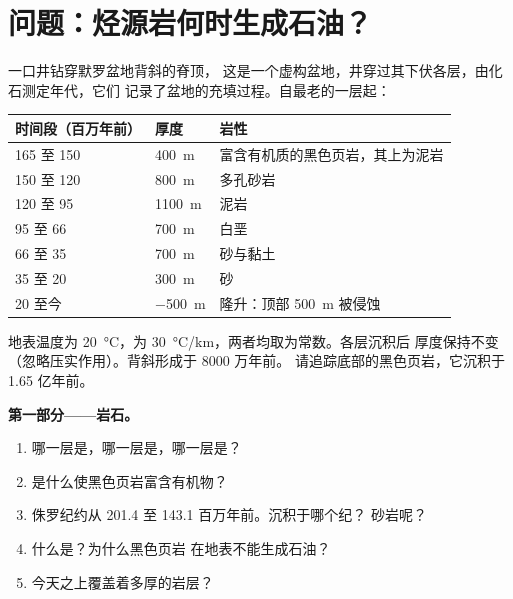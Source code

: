 \section{问题：烃源岩何时生成石油？}

\begin{problem}
\label{pb:g11:fossil-fuel-geology:1}
一口井钻穿默罗盆地背斜的脊顶，
这是一个虚构盆地，井穿过其下伏各层，由化石测定年代，它们
记录了盆地的充填过程。自最老的一层起：
\begin{center}
\small
\begin{tabular}{|l|l|l|}
\hline
\textbf{时间段（百万年前）} & \textbf{厚度} & \textbf{岩性} \\
\hline
165 至 150 & \qty{400}{m} & 富含有机质的黑色页岩，其上为泥岩 \\
150 至 120 & \qty{800}{m} & 多孔砂岩 \\
120 至 95 & \qty{1100}{m} & 泥岩 \\
95 至 66 & \qty{700}{m} & 白垩 \\
66 至 35 & \qty{700}{m} & 砂与黏土 \\
35 至 20 & \qty{300}{m} & 砂 \\
20 至今 & \qty{-500}{m} & 隆升：顶部 \qty{500}{m} 被侵蚀 \\
\hline
\end{tabular}
\end{center}
地表温度为 \qty{20}{\degreeCelsius}，为
\qty{30}{\degreeCelsius/km}，两者均取为常数。各层沉积后
厚度保持不变（忽略压实作用）。背斜形成于 8000 万年前。
请追踪底部的黑色页岩，它沉积于 1.65
亿年前。

\medskip
\noindent\textbf{第一部分——岩石。}
\begin{enumerate}
  \item 哪一层是，哪一层是，哪一层是？
  \item 是什么使黑色页岩富含有机物？
  \item 侏罗纪约从 \num{201.4} 至 \num{143.1}
        百万年前。沉积于哪个纪？
        砂岩呢？
  \item 什么是？为什么黑色页岩
        在地表不能生成石油？
  \item 今天之上覆盖着多厚的岩层？
\end{enumerate}


\end{problem}
